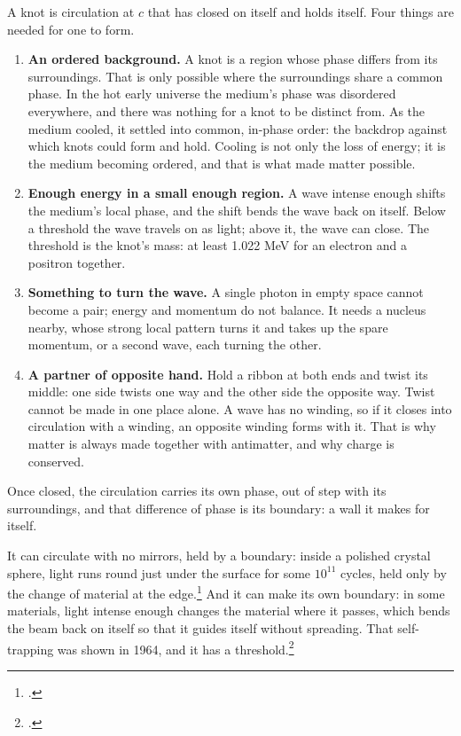 \documentclass[11pt,a4paper]{article}
\newcommand{\fn}[1]{\footnote{\citealp{#1}.}}
\begin{document}
\begin{hypbar}
A knot is circulation at $c$ that has closed on itself and holds itself. Four things are needed for one to form.
\begin{enumerate}
\item \textbf{An ordered background.} A knot is a region whose phase differs from its surroundings. That is only possible where the surroundings share a common phase. In the hot early universe the medium's phase was disordered everywhere, and there was nothing for a knot to be distinct from. As the medium cooled, it settled into common, in-phase order: the backdrop against which knots could form and hold. Cooling is not only the loss of energy; it is the medium becoming ordered, and that is what made matter possible.
\item \textbf{Enough energy in a small enough region.} A wave intense enough shifts the medium's local phase, and the shift bends the wave back on itself. Below a threshold the wave travels on as light; above it, the wave can close. The threshold is the knot's mass: at least 1.022 MeV for an electron and a positron together.
\item \textbf{Something to turn the wave.} A single photon in empty space cannot become a pair; energy and momentum do not balance. It needs a nucleus nearby, whose strong local pattern turns it and takes up the spare momentum, or a second wave, each turning the other.
\item \textbf{A partner of opposite hand.} Hold a ribbon at both ends and twist its middle: one side twists one way and the other side the opposite way. Twist cannot be made in one place alone. A wave has no winding, so if it closes into circulation with a winding, an opposite winding forms with it. That is why matter is always made together with antimatter, and why charge is conserved.
\end{enumerate}
Once closed, the circulation carries its own phase, out of step with its surroundings, and that difference of phase is its boundary: a wall it makes for itself.
\end{hypbar}

 It can circulate with no mirrors, held by a boundary: inside a polished crystal sphere, light runs round just under the surface for some $10^{11}$ cycles, held only by the change of material at the edge.\fn{grudinin2006} And it can make its own boundary: in some materials, light intense enough changes the material where it passes, which bends the beam back on itself so that it guides itself without spreading. That self-trapping was shown in 1964, and it has a threshold.\fn{chiao1964} 
\end{document}
